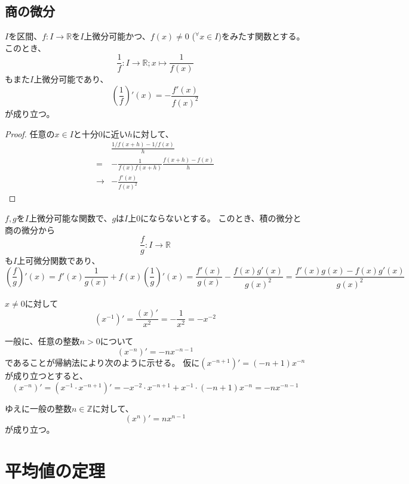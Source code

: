 \subsection{商の微分}

\begin{theorem}
  $I$を区間、$f:I\to\mathbb{R}$を$I$上微分可能かつ、$f(x)\neq0$ (${}^\forall x\in I$)をみたす関数とする。
  このとき、
  \[
    \frac{1}{f}:I\to\mathbb{R};x\mapsto\frac{1}{f(x)}
  \]
  もまた$I$上微分可能であり、
  \[
    \left(\frac{1}{f}\right)'(x)=-\frac{f'(x)}{f(x)^2}
  \]
  が成り立つ。
\end{theorem}
\begin{proof}
  任意の$x\in I$と十分0に近い$h$に対して、
  \begin{align*}
    &\frac{1/f(x+h)-1/f(x)}{h}\\
    =&-\frac{1}{f(x)f(x+h)}\frac{f(x+h)-f(x)}{h}\\
    \to&-\frac{f'(x)}{f(x)^2}
  \end{align*}
\end{proof}

\begin{example}
  $f,g$を$I$上微分可能な関数で、$g$は$I$上0にならないとする。
  このとき、積の微分と商の微分から
  \[
    \frac{f}{g}:I\to\mathbb{R}
  \]
  も$I$上可微分関数であり、
  \[
    \left(\frac{f}{g}\right)'(x)=f'(x)\frac{1}{g(x)}+f(x)\left(\frac{1}{g}\right)'(x)=\frac{f'(x)}{g(x)}-\frac{f(x)g'(x)}{g(x)^2}=\frac{f'(x)g(x)-f(x)g'(x)}{g(x)^2}
  \]
\end{example}

\begin{example}
  $x\neq0$に対して
  \[
    (x^{-1})'=\frac{(x)'}{x^2}=-\frac{1}{x^2}=-x^{-2}
  \]

  一般に、任意の整数$n>0$について
  \[
    (x^{-n})'=-nx^{-n-1}
  \]
  であることが帰納法により次のように示せる。
  仮に$(x^{-n+1})'=(-n+1)x^{-n}$が成り立つとすると、
  \[
    (x^{-n})'=(x^{-1}\cdot x^{-n+1})'=-x^{-2}\cdot x^{-n+1}+x^{-1}\cdot(-n+1)x^{-n}=-nx^{-n-1}
  \]

  ゆえに一般の整数$n\in\mathbb{Z}$に対して、
  \[
    (x^n)'=nx^{n-1}
  \]
  が成り立つ。
\end{example}



\section{平均値の定理}\label{sec:mean-value-theorem}

